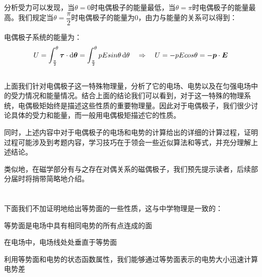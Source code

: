 分析受力可以发现，当$\theta = 0$时电偶极子的能量最低，当$\theta =\pi$时电偶极子的能量最高。我们规定当$\theta=\dfrac{\pi}{2}$时电偶极子的能量为0，由力与能量的关系可以得到：
\begin{law}
    电偶极子系统的能量为：
    \[U=\int_\frac{\pi}{2}^{\theta} \vec{\tau}\cdot \dif{\vec{\theta}}=\int_\frac{\pi}{2}^{\theta} pEsin\theta \dif{\theta} \quad\Rightarrow\quad U=-pEcos\theta=-\vec{p}\cdot\vec{E}\]
\end{law}
\subsection[电偶极子总结]{}
上面我们针对电偶极子这一特殊物理量，分析了它的电场、电势以及在匀强电场中的受力情况和能量情况。结合上面的结论我们可以看到，对于这一特殊的物理系统，电偶极矩始终是描述这些性质的重要物理量。因此对于电偶极子，我们很少讨论具体的受力和能量，而一般用电偶极矩描述它的性质。

同时，上述内容中对于电偶极子的电场和电势的计算给出的详细的计算过程，证明过程可能涉及到考题内容，学习技巧在于领会一些近似算法和等式，并充分理解上述结论。

类似地，在磁学部分有与之存在对偶关系的磁偶极子，我们预先提示读者，后续部分届时将捎带简略地介绍。
\section[导体与等势面]{}
下面我们不加证明地给出等势面的一些性质，这与中学物理是一致的：
\begin{Itemize}
    \item 等势面是电场中具有相同电势的所有点连成的面
    \item 在电场中，电场线处处垂直于等势面
    \item 利用等势面和电势的状态函数属性，我们能够通过等势面表示的电势大小迅速计算电势差
\end{Itemize}

